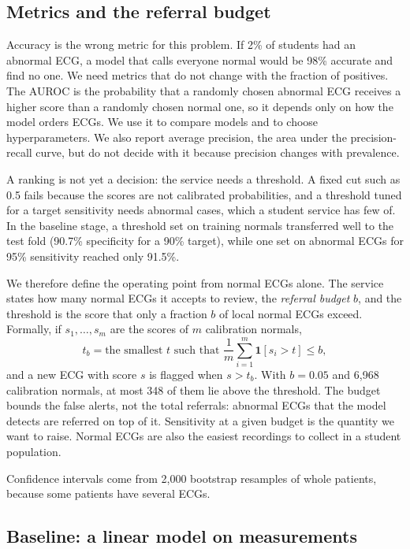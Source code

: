 \documentclass[letterpaper,11pt]{article}
\begin{document}
\subsection{Metrics and the referral budget}
\label{sec:budget}

Accuracy is the wrong metric for this problem. If 2\% of students had an abnormal ECG, a model that calls everyone normal would be 98\% accurate and find no one. We need metrics that do not change with the fraction of positives. The AUROC is the probability that a randomly chosen abnormal ECG receives a higher score than a randomly chosen normal one, so it depends only on how the model orders ECGs. We use it to compare models and to choose hyperparameters. We also report average precision, the area under the precision-recall curve, but do not decide with it because precision changes with prevalence.

A ranking is not yet a decision: the service needs a threshold. A fixed cut such as 0.5 fails because the scores are not calibrated probabilities, and a threshold tuned for a target sensitivity needs abnormal cases, which a student service has few of. In the baseline stage, a threshold set on training normals transferred well to the test fold (90.7\% specificity for a 90\% target), while one set on abnormal ECGs for 95\% sensitivity reached only 91.5\%.

We therefore define the operating point from normal ECGs alone. The service states how many normal ECGs it accepts to review, the \emph{referral budget} $b$, and the threshold is the score that only a fraction $b$ of local normal ECGs exceed. Formally, if $s_1,\dots,s_m$ are the scores of $m$ calibration normals,
\begin{equation}
  t_b = \text{the smallest } t \text{ such that } \frac{1}{m}\sum_{i=1}^{m} \mathbf{1}[s_i > t] \le b ,
  \label{eq:budget}
\end{equation}
and a new ECG with score $s$ is flagged when $s > t_b$. With $b = 0.05$ and 6,968 calibration normals, at most 348 of them lie above the threshold. The budget bounds the false alerts, not the total referrals: abnormal ECGs that the model detects are referred on top of it. Sensitivity at a given budget is the quantity we want to raise. Normal ECGs are also the easiest recordings to collect in a student population.

Confidence intervals come from 2,000 bootstrap resamples of whole patients, because some patients have several ECGs.

\subsection{Baseline: a linear model on measurements}
\end{document}
